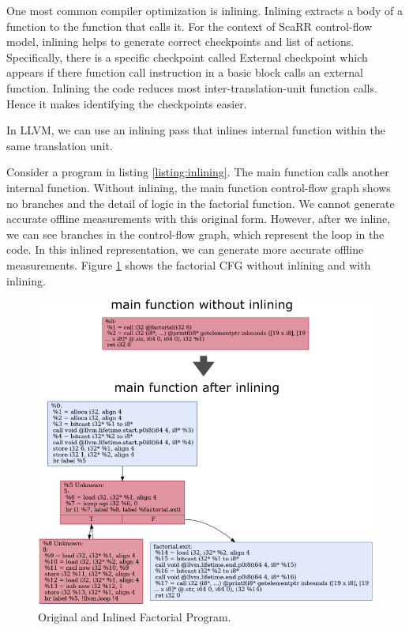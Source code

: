 One most common compiler optimization is inlining. Inlining extracts a body of a
function to the function that calls it. For the context of ScaRR control-flow
model, inlining helps to generate correct checkpoints and list of actions.
Specifically, there is a specific checkpoint called External checkpoint which
appears if there function call instruction in a basic block calls an external
function. Inlining the code reduces most inter-translation-unit function
calls. Hence it makes identifying the checkpoints easier.

In LLVM, we can use an inlining pass that inlines internal function within the same
translation unit.

Consider a program in listing \ref{listing:inlining}. The main function calls
another internal function. Without inlining, the main function control-flow
graph shows no branches and the detail of logic in the factorial function. We
cannot generate accurate offline measurements with this original form. However,
after we inline, we can see branches in the control-flow graph, which represent
the loop in the code. In this inlined representation, we can generate more
accurate offline measurements. Figure \ref{fig:inlining} shows the factorial CFG
without inlining and with inlining.


\begin{figure}[h]
    \centerline{\includegraphics[scale=.80]{Figures/04/inlining-function.png}}
    \caption{Original and Inlined Factorial Program.}
    \label{fig:inlining}
\end{figure}

